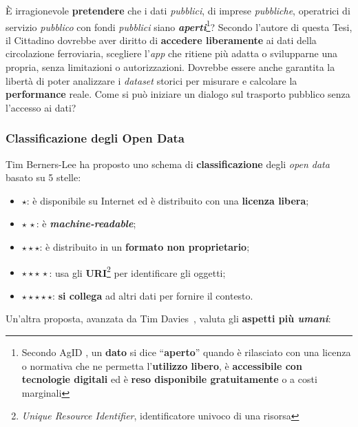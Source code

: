 \documentclass[12pt,italian]{report}
\begin{document}
È irragionevole \textbf{pretendere} che i dati \textit{pubblici}, di
imprese \textit{pubbliche}, operatrici di servizio \textit{pubblico}
con fondi \textit{pubblici} siano
\textbf{\textit{aperti}}\footnote{Secondo AgID \cite{AgidOpenData}, un
    \textbf{dato} si dice ``\textbf{aperto}'' quando è rilasciato con
    una licenza o normativa che ne permetta l'\textbf{utilizzo
        libero}, è \textbf{accessibile con tecnologie digitali} ed è
    \textbf{reso disponibile gratuitamente} o a costi marginali}?
Secondo l'autore di questa Tesi, il Cittadino dovrebbe aver diritto di
\textbf{accedere liberamente} ai dati della circolazione ferroviaria,
scegliere l'\textit{app} che ritiene più adatta o svilupparne una
propria, senza limitazioni o autorizzazioni.  Dovrebbe essere anche
garantita la libertà di poter analizzare i \textit{dataset} storici
per misurare e calcolare la \textbf{performance} reale.  Come si può
iniziare un dialogo sul trasporto pubblico senza l'accesso ai dati?

\subsubsection{Classificazione degli Open Data}

Tim Berners-Lee ha proposto \cite{W3LinkedData} uno schema di
\textbf{classificazione} degli \textit{open data} basato su 5 stelle:
\begin{itemize}
    \item $\star$: è disponibile su Internet ed è distribuito con una
    \textbf{licenza libera};
    \item $\star\,\star$: è \textbf{\textit{machine-readable}};
    \item $\star \star \star$: è distribuito in un \textbf{formato non
        proprietario};
    \item $\star \star \star\,\star$: usa gli
    \textbf{URI}\footnote{\textit{Unique Resource Identifier},
        identificatore univoco di una risorsa} per identificare gli
    oggetti;
    \item $\star \star \star \star \star$: \textbf{si collega} ad
    altri dati per fornire il contesto.
\end{itemize}

Un'altra proposta, avanzata da Tim Davies~\cite{DaviesOpenData},
valuta gli \textbf{aspetti più \textit{umani}}:
\end{document}
